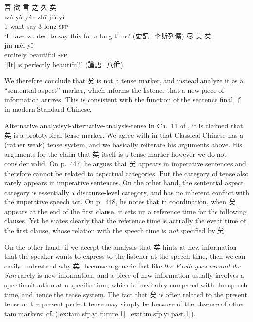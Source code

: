 \documentclass[UTF8, a4paper, oneside, scheme=plain, 12pt]{ctexrep}
\newcommand*{\citechap}[1]{Ch.~{#1}}
\newcommand*{\citepage}[1]{p.~{#1}}
\newcommand{\form}[1]{\emph{#1}}
\newcommand{\translate}[1]{`#1'}
\newcommand*{\category}[1]{\textsc{#1}}
\begin{document}
\begin{exe}
    \ex\label{ex:tam.sfp.yi.attitude.1}
    \glll 吾 欲 言 之 久 矣 \\
    wú yù yán zhī jiǔ yǐ \\
    1 want say 3 long \category{sfp} \\
    \glt\translate{I have wanted to say this for a long time.} \hfill (史記·李斯列傳)
    \ex\label{ex:tam.sfp.yi.attitude.2}
    \glll 尽 美 矣 \\
    jìn měi yǐ \\
    entirely beautiful \category{sfp} \\
    \glt\translate{[It] is perfectly beautiful!} \hfill (論語·八佾)
\end{exe}

We therefore conclude that 矣 is not a tense marker,
and instead analyze it as a ``sentential aspect'' marker,
which informs the listener that a new piece of information arrives.
This is consistent with the function of the sentence final 了 in modern Standard Chinese.

\begin{infobox}{Alternative analysis}{yi-alternative-analysis-tense}
    In \citechap{11} of \citet{meiguang2018}, it is claimed that 矣 is a prototypical tense marker.
    We agree with \citet{meiguang2018} in that Classical Chinese has a (rather weak) tense system, and we basically reiterate his arguments above.
    His arguments for the claim that 矣 itself is a tense marker however we do not consider valid.
    On \citepage{447}, he argues that 矣 appears in imperative sentences and therefore cannot be related to aspectual categories.
    But the category of tense also rarely appears in imperative sentences.
    On the other hand, the sentential aspect category is essentially a discourse-level category, and has no inherent conflict with the imperative speech act.
    On \citepage{448}, he notes that in coordination, when 矣 appears at the end of the first clause, it sets up a reference time for the following clauses.
    Yet he states clearly that the reference time is actually the event time of the first clause,
    whose relation with the speech time is \emph{not} specified by 矣.

    On the other hand, if we accept the analysis that 矣 hints at new information that the speaker wants to express to the listener at the speech time,
    then we can easily understand why 矣,
    because a generic fact like \form{the Earth goes around the Sun} rarely is new information,
    and a piece of new information usually involves a specific situation at a specific time,
    which is inevitably compared with the speech time, and hence the tense system.
    The fact that 矣 is often related to the present tense or the present perfect tense 
    may simply be because of the absence of other \ac{tam} markers:
    cf. (\ref{ex:tam.sfp.yi.future.1}, \ref{ex:tam.sfp.yi.past.1}).
\end{infobox}
\end{document}
